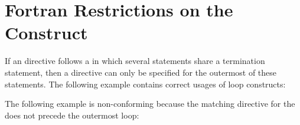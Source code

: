 \pagebreak
\section{Fortran Restrictions on the  Construct}
\label{sec:fort_do}
\fortranspecificstart

If an  directive follows a   in which several 
 statements share a  termination statement, then a   
directive can only be specified for the outermost of these  statements. 
The following example contains correct usages of loop constructs:


The following example is non-conforming because the matching  directive 
for the  does not precede the outermost loop:

\fortranspecificend


